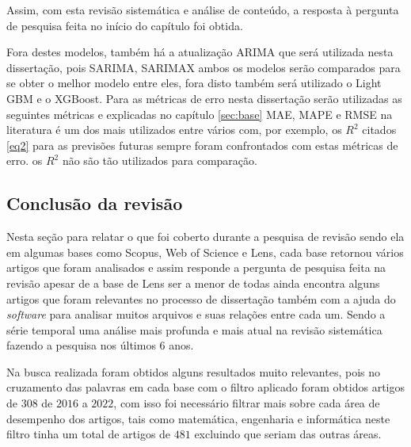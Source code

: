  
Assim, com esta revisão sistemática e análise de conteúdo, a resposta à pergunta de pesquisa feita no início do capítulo foi obtida.

Fora destes modelos, também há a atualização ARIMA que será utilizada nesta dissertação, pois SARIMA, SARIMAX ambos os modelos serão comparados para se obter o melhor modelo entre eles, fora disto também será utilizado o Light GBM e o XGBoost. Para as métricas de erro nesta dissertação serão utilizadas as seguintes métricas e explicadas no capítulo \ref{sec:base} MAE, MAPE e RMSE na literatura é um dos mais utilizados entre vários com, por exemplo, os $R^2$ citados \eqref{eq2} para as previsões futuras sempre foram confrontados com estas métricas de erro. os $R^2$ não são tão utilizados para comparação.



\subsection{Conclus\~ao da revis\~ao} \label{subsec:conclusão da revisão}

Nesta seção para relatar o que foi coberto durante a pesquisa de revisão sendo ela em algumas bases como Scopus, Web of Science e Lens, cada base retornou vários artigos que foram analisados e assim responde a pergunta de pesquisa feita na revisão apesar de a base de Lens ser a menor de todas ainda encontra alguns artigos que foram relevantes no processo de dissertação também com a ajuda do \textit{software} para analisar muitos arquivos e suas relações entre cada um. Sendo a série temporal uma análise mais profunda e mais atual na revisão sistemática fazendo a pesquisa nos últimos 6 anos.

Na busca realizada foram obtidos alguns resultados muito relevantes, pois no cruzamento das palavras em cada base com o filtro aplicado foram obtidos artigos de $308$ de $2016$ a $2022$, com isso foi necessário filtrar mais sobre cada área de desempenho dos artigos, tais como matemática, engenharia e informática neste filtro tinha um total de artigos de $481$ excluindo que seriam das outras áreas.




